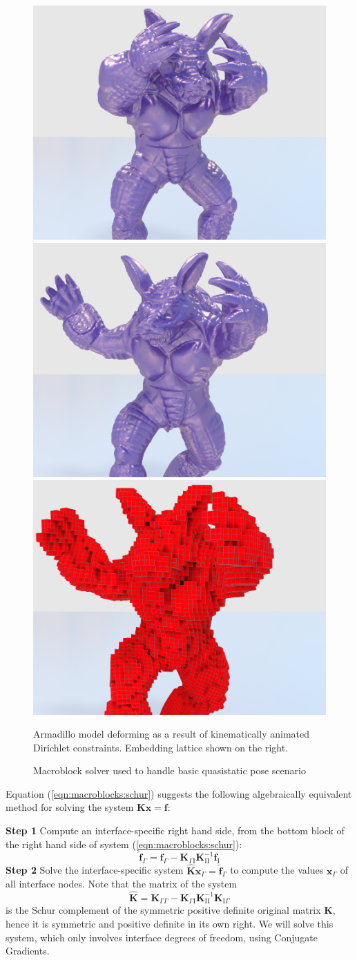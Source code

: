 \begin{figure}
\begin{center}
\includegraphics[width=.32\textwidth]{chapter_macroblocks/images/armadillo1.png}
\includegraphics[width=.32\textwidth]{chapter_macroblocks/images/armadillo2.png}
\includegraphics[width=.32\textwidth]{chapter_macroblocks/images/armadillo3.png}
\end{center}
\caption{Macroblock solver used to handle basic quasistatic pose
  scenario}{Armadillo model deforming as a result of kinematically
  animated Dirichlet constraints. Embedding lattice shown on the
  right.}
 \label{fig:macroblocks:armadillo-example}
\end{figure}

Equation (\ref{eqn:macroblocks:schur}) suggests the following algebraically
equivalent method for solving the system $\mathbf{Kx=f}$:

\noindent\textbf{Step 1} Compute an interface-specific right hand
side, from the bottom block of the right hand side of system
(\ref{eqn:macroblocks:schur}):
\begin{equation}
\hat{\mathbf{f}}_{\Gamma}=\mathbf{f}_{\Gamma}-\mathbf{K}_{\Gamma\mathrm{I}}\mathbf{K}_{\mathrm{I}\mathrm{I}}^{-1}\mathbf{f}_{\mathrm{I}}
\label{eqn:macroblocks:ItoGamma}
\end{equation}
\noindent\textbf{Step 2} Solve the interface-specific system $\hat{\mathbf{K}}\mathbf{x}_\Gamma=\hat{\mathbf{f}}_{\Gamma}$ to compute the values $\mathbf{x}_\Gamma$ of all
interface nodes. Note that the matrix of the system
\begin{equation}
\hat{\mathbf{K}}=\mathbf{K}_{\Gamma\Gamma}- \mathbf{K}_{\Gamma\mathrm{I}}\mathbf{K}_{\mathrm{I}\mathrm{I}}^{-1}\mathbf{K}_{\mathrm{I}\Gamma}
\label{eqn:macroblocks:KGamma}
\end{equation}
is the Schur complement of the symmetric positive definite original
matrix $\mathbf{K}$, hence it is symmetric and positive definite in
its own right. We will solve this system, which only involves
interface degrees of freedom, using Conjugate Gradients.


